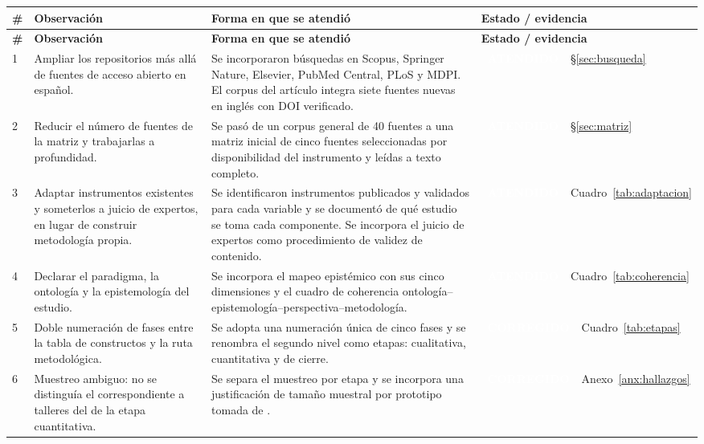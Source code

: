 \documentclass[letter,12pt]{article}
\newcommand{\bOK}{\colorbox{colorPropuesto}{\textcolor{white}{\scriptsize\textbf{~ATENDIDO~}}}}
\newcommand{\bCOR}{\colorbox{colorNuevo}{\textcolor{white}{\scriptsize\textbf{~CORREGIDO~}}}}
\begin{document}
\begin{longtable}{|p{0.5cm}|p{4.4cm}|p{5.2cm}|p{3.4cm}|}
\hline
\rowcolor{bgCotejo}
\textbf{\#} & \textbf{Observación} & \textbf{Forma en que se atendió} & \textbf{Estado / evidencia} \\
\hline
\endfirsthead
\hline
\rowcolor{bgCotejo}
\textbf{\#} & \textbf{Observación} & \textbf{Forma en que se atendió} & \textbf{Estado / evidencia} \\
\hline
\endhead

1 & Ampliar los repositorios más allá de fuentes de acceso abierto en español. & Se incorporaron búsquedas en Scopus, Springer Nature, Elsevier, PubMed Central, PLoS y MDPI. El corpus del artículo integra siete fuentes nuevas en inglés con DOI verificado. & \bOK~\S\ref{sec:busqueda} \\
\hline

2 & Reducir el número de fuentes de la matriz y trabajarlas a profundidad. & Se pasó de un corpus general de 40 fuentes a una matriz inicial de cinco fuentes seleccionadas por disponibilidad del instrumento y leídas a texto completo. & \bOK~\S\ref{sec:matriz} \\
\hline

3 & Adaptar instrumentos existentes y someterlos a juicio de expertos, en lugar de construir metodología propia. & Se identificaron instrumentos publicados y validados para cada variable y se documentó de qué estudio se toma cada componente. Se incorpora el juicio de expertos como procedimiento de validez de contenido. & \bOK~Cuadro~\ref{tab:adaptacion} \\
\hline

4 & Declarar el paradigma, la ontología y la epistemología del estudio. & Se incorpora el mapeo epistémico con sus cinco dimensiones y el cuadro de coherencia ontología--epistemología--perspectiva--metodología. & \bOK~Cuadro~\ref{tab:coherencia} \\
\hline

5 & Doble numeración de fases entre la tabla de constructos y la ruta metodológica. & Se adopta una numeración única de cinco fases y se renombra el segundo nivel como etapas: cualitativa, cuantitativa y de cierre. & \bCOR~Cuadro~\ref{tab:etapas} \\
\hline

6 & Muestreo ambiguo: no se distinguía el correspondiente a talleres del de la etapa cuantitativa. & Se separa el muestreo por etapa y se incorpora una justificación de tamaño muestral por prototipo tomada de \citet{reyes2019desarrollo}. & \bCOR~Anexo~\ref{anx:hallazgos} \\
\hline


\end{longtable}
\end{document}
